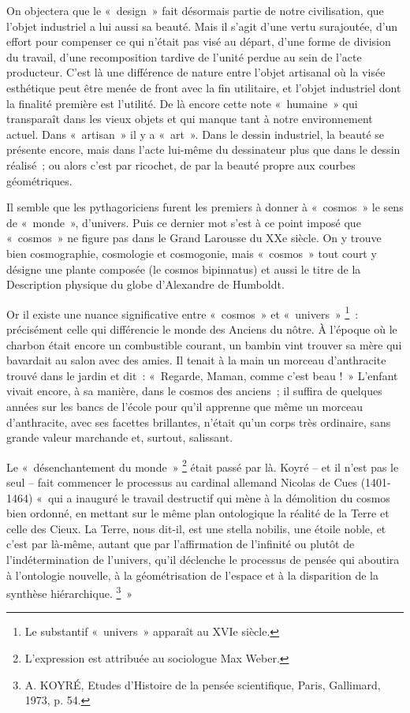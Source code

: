 \documentclass[a4paper,12pt]{article}
\begin{document}
On objectera que le « design » fait désormais partie de notre civilisation, que l'objet industriel a lui aussi sa beauté. Mais il s'agit d'une vertu surajoutée, d'un effort pour compenser ce qui n'était pas visé au départ, d’une forme de division du travail, d'une recomposition tardive de l'unité perdue au sein de l'acte producteur. C'est là une différence de nature entre l'objet artisanal où la visée esthétique peut être menée de front avec la fin utilitaire, et l’objet industriel dont la finalité première est l'utilité. De là encore cette note « humaine » qui transparaît dans les vieux objets et qui manque tant à notre environnement actuel. Dans « artisan » il y a « art ». Dans le dessin industriel, la beauté se présente encore, mais dans l’acte lui-même du dessinateur plus que dans le dessin réalisé ; ou alors c’est par ricochet, de par la beauté propre aux courbes géométriques.

Il semble que les pythagoriciens furent les premiers à donner à « cosmos » le sens de « monde », d'univers. Puis ce dernier mot s'est à ce point imposé que « cosmos » ne figure pas dans le Grand Larousse du XXe siècle. On y trouve bien cosmographie, cosmologie et cosmogonie, mais « cosmos » tout court y désigne une plante composée (le cosmos bipinnatus) et aussi le titre de la Description physique du globe d’Alexandre de Humboldt. 

Or il existe une nuance significative entre « cosmos » et « univers » \footnote{Le substantif « univers » apparaît au XVIe siècle.} : précisément celle qui différencie le monde des Anciens du nôtre. À l'époque où le charbon était encore un combustible courant, un bambin vint trouver sa mère qui bavardait au salon avec des amies. Il tenait à la main un morceau d'anthracite trouvé dans le jardin et dit : « Regarde, Maman, comme c’est beau ! » L'enfant vivait encore, à sa manière, dans le cosmos des anciens ; il suffira de quelques années sur les bancs de l'école pour qu'il apprenne que même un morceau d'anthracite, avec ses facettes brillantes, n'était qu'un corps très ordinaire, sans grande valeur marchande et, surtout, salissant.

Le « désenchantement du monde » \footnote{L’expression est attribuée au sociologue Max Weber.} était passé par là. Koyré – et il n'est pas le seul – fait commencer le processus au cardinal allemand Nicolas de Cues (1401-1464) « qui a inauguré le travail destructif qui mène à la démolition du cosmos bien ordonné, en mettant sur le même plan ontologique la réalité de la Terre et celle des Cieux. La Terre, nous dit-il, est une stella nobilis, une étoile noble, et c'est par là-même, autant que par l'affirmation de l'infinité ou plutôt de l'indétermination de l'univers, qu'il déclenche le processus de pensée qui aboutira à l'ontologie nouvelle, à la géométrisation de l'espace et à la disparition de la synthèse hiérarchique. \footnote{A. KOYRÉ, Etudes d’Histoire de la pensée scientifique, Paris, Gallimard, 1973, p. 54.} » 
\end{document}
